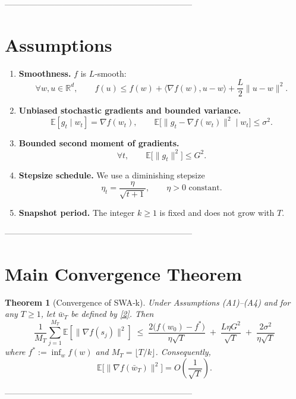 \documentclass{article}
\newcommand{\E}{\mathbb{E}}
\newcommand{\R}{\mathbb{R}}
\newtheorem{theorem}{Theorem}
\begin{document}
--------------------------------------------------------------------

\section*{Assumptions}
\begin{enumerate}
\item \textbf{Smoothness.} $f$ is $L$‑smooth:
\[
\forall w,u\in\R^{d},\qquad 
f(u)\le f(w)+\langle\nabla f(w),u-w\rangle+\frac{L}{2}\|u-w\|^{2}. \tag{A1}
\]

\item \textbf{Unbiased stochastic gradients and bounded variance.}
\[
\E[g_t\mid w_t]=\nabla f(w_t),\qquad 
\E\big[\|g_t-\nabla f(w_t)\|^{2}\mid w_t\big]\le\sigma^{2}. \tag{A2}
\]

\item \textbf{Bounded second moment of gradients.}
\[
\forall t,\qquad \E\big[\|g_t\|^{2}\big]\le G^{2}. \tag{A3}
\]

\item \textbf{Stepsize schedule.}
We use a diminishing stepsize
\[
\eta_t=\frac{\eta}{\sqrt{t+1}},\qquad \eta>0 \text{ constant}. \tag{A4}
\]
\item \textbf{Snapshot period.}
The integer $k\ge 1$ is fixed and does not grow with $T$.
\end{enumerate}

--------------------------------------------------------------------

\section*{Main Convergence Theorem}
\begin{theorem}[Convergence of SWA‑k]\label{thm:swa}
Under Assumptions (A1)–(A4) and for any $T\ge 1$, let
$\bar w_T$ be defined by \eqref{2}.  Then
\[
\boxed{
\frac{1}{M_T}\sum_{j=1}^{M_T}\E\!\left[\big\|\nabla f(s_j)\big\|^{2}\right]
\;\le\;
\frac{2\big(f(w_0)-f^{*}\big)}{\eta\sqrt{T}}
\;+\;
\frac{L\eta G^{2}}{\sqrt{T}}
\;+\;
\frac{2\sigma^{2}}{\eta\sqrt{T}} } \tag{4}
\]
where $f^{*}:=\inf_{w}f(w)$ and $M_T=\lfloor T/k\rfloor$.
Consequently,
\[
\E\!\big[\|\nabla f(\bar w_T)\|^{2}\big]=O\!\left(\frac{1}{\sqrt{T}}\right).
\]
\end{theorem}

--------------------------------------------------------------------
\end{document}
